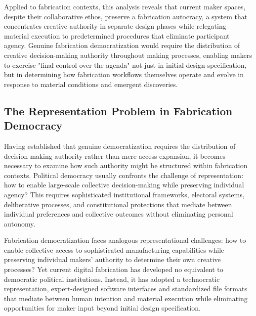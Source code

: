\vspace{0.5cm}

Applied to fabrication contexts, this analysis reveals that current maker spaces, despite their collaborative ethos, preserve a fabrication autocracy, a system that concentrates creative authority in separate design phases while relegating material execution to predetermined procedures that eliminate participant agency. Genuine fabrication democratization would require the distribution of creative decision-making authority throughout making processes, enabling makers to exercise "final control over the agenda" not just in initial design specification, but in determining how fabrication workflows themselves operate and evolve in response to material conditions and emergent discoveries.

\subsection{The Representation Problem in Fabrication Democracy}

Having established that genuine democratization requires the distribution of decision-making authority rather than mere access expansion, it becomes necessary to examine how such authority might be structured within fabrication contexts. Political democracy usually confronts the challenge of representation: how to enable large-scale collective decision-making while preserving individual agency? This requires sophisticated institutional frameworks, electoral systems, deliberative processes, and constitutional protections that mediate between individual preferences and collective outcomes without eliminating personal autonomy.

\vspace{0.5cm}

Fabrication democratization faces analogous representational challenges: how to enable collective access to sophisticated manufacturing capabilities while preserving individual makers' authority to determine their own creative processes? Yet current digital fabrication has developed no equivalent to democratic political institutions. Instead, it has adopted  a technocratic representation, expert-designed software interfaces and standardized file formats that mediate between human intention and material execution while eliminating opportunities for maker input beyond initial design specification.

\vspace{0.5cm}

